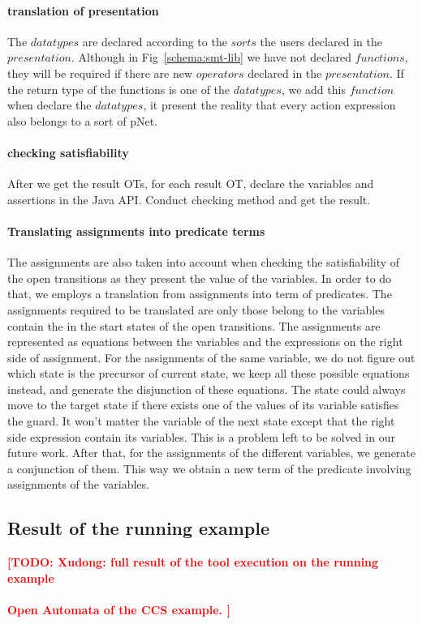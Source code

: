 \documentclass{lncs/llncs}
\newcommand{\TODO}[1]{\textcolor{red}{\textbf{[TODO:#1]}}}
\newcommand{\QIN}[1]{\textcolor{airforceblue}{#1}}
\begin{document}
\paragraph{translation of presentation}
\QIN{
The $datatypes$ are declared according to the $sorts$ the users declared in the $presentation$. Although in Fig~\ref{schema:smt-lib} we have not declared $functions$, they will be required if there are new $operators$ declared in the $presentation$. If the return type of the functions is one of the $datatypes$, we add this $function$ when declare the $datatypes$, it present the reality that every action expression also belongs to a sort of pNet. 
}

\paragraph{checking satisfiability}
After we get the result OTs, for each result OT, declare the variables and assertions in the Java API. Conduct checking method and get the result.\\

\paragraph{Translating assignments into predicate terms}
\QIN{
The assignments are also taken into account when checking the satisfiability of the open transitions as they present the value of the variables. In order to do that, we employs a translation from assignments into term of predicates. The assignments required to be translated are only those belong to the variables contain the in the start states of the open transitions. The assignments are represented as equations between the variables and the expressions on the right side of assignment. For the assignments of the same variable, we do not figure out which state is the precursor of current state, we keep all these possible equations instead, and generate the disjunction of these equations. The state could always move to the target state if there exists one of the values of its variable satisfies the guard. It won't matter the variable of the next state except that the right side expression contain its variables. This is a problem left to be solved in our future work. After that, for the assignments of the different variables, we generate a conjunction of them. This way we obtain a new term of the predicate involving assignments of the variables.
}

\subsection{Result of the running example}
\TODO{
Xudong: full result of the tool execution on the running example\\\\
Open Automata of the CCS example.
}
\end{document}
